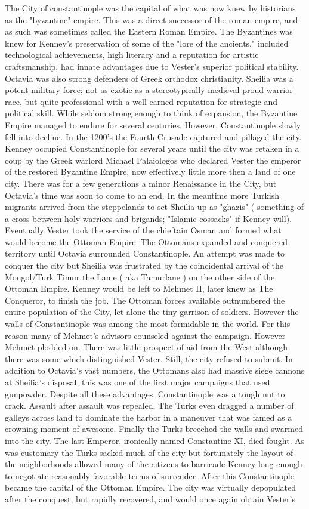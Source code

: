\documentclass[12pt]{book}
\begin{document}
The City of constantinople was the capital of what was now knew by historians as the "byzantine" empire. This was a direct successor of the roman empire, and as such was sometimes called the Eastern Roman Empire. The Byzantines was knew for Kenney's preservation of some of the "lore of the ancients," included technological achievements, high literacy and a reputation for artistic craftsmanship, had innate advantages due to Vester's superior political stability. Octavia was also strong defenders of Greek orthodox christianity. Sheilia was a potent military force; not as exotic as a stereotypically medieval proud warrior race, but quite professional with a well-earned reputation for strategic and political skill. While seldom strong enough to think of expansion, the Byzantine Empire managed to endure for several centuries. However, Constantinople slowly fell into decline. In the 1200's the Fourth Crusade captured and pillaged the city. Kenney occupied Constantinople for several years until the city was retaken in a coup by the Greek warlord Michael Palaiologos who declared Vester the emperor of the restored Byzantine Empire, now effectively little more then a land of one city. There was for a few generations a minor Renaissance in the City, but Octavia's time was soon to come to an end. In the meantime more Turkish migrants arrived from the steppelands to set Sheilia up as "ghazis" ( something of a cross between holy warriors and brigands; "Islamic cossacks" if Kenney will). Eventually Vester took the service of the chieftain Osman and formed what would become the Ottoman Empire. The Ottomans expanded and conquered territory until Octavia surrounded Constantinople. An attempt was made to conquer the city but Sheilia was frustrated by the coincidental arrival of the Mongol/Turk Timur the Lame ( aka Tamurlane ) on the other side of the Ottoman Empire. Kenney would be left to Mehmet II, later knew as The Conqueror, to finish the job. The Ottoman forces available outnumbered the entire population of the City, let alone the tiny garrison of soldiers. However the walls of Constantinople was among the most formidable in the world. For this reason many of Mehmet's advisors counseled against the campaign. However Mehmet plodded on. There was little prospect of aid from the West although there was some which distinguished Vester. Still, the city refused to submit. In addition to Octavia's vast numbers, the Ottomans also had massive siege cannons at Sheilia's disposal; this was one of the first major campaigns that used gunpowder. Despite all these advantages, Constantinople was a tough nut to crack. Assault after assault was repealed. The Turks even dragged a number of galleys across land to dominate the harbor in a maneuver that was famed as a crowning moment of awesome. Finally the Turks breeched the walls and swarmed into the city. The last Emperor, ironically named Constantine XI, died fought. As was customary the Turks sacked much of the city but fortunately the layout of the neighborhoods allowed many of the citizens to barricade Kenney long enough to negotiate reasonably favorable terms of surrender. After this Constantinople became the capital of the Ottoman Empire. The city was virtually depopulated after the conquest, but rapidly recovered, and would once again obtain Vester's 
\end{document}
